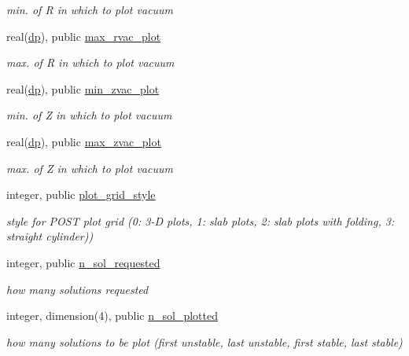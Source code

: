 \begin{DoxyCompactItemize}
\begin{DoxyCompactList}\small\item\em min. of {\ttfamily R} in which to plot vacuum \end{DoxyCompactList}\item 
real(\hyperlink{namespacenum__vars_a03802aa2bd86439d7a9370836fabf3f2}{dp}), public \hyperlink{namespacenum__vars_a6b703d539ded323851dce024a4b33df7}{max\+\_\+rvac\+\_\+plot}
\begin{DoxyCompactList}\small\item\em max. of {\ttfamily R} in which to plot vacuum \end{DoxyCompactList}\item 
real(\hyperlink{namespacenum__vars_a03802aa2bd86439d7a9370836fabf3f2}{dp}), public \hyperlink{namespacenum__vars_ab9fd7d4e9921ff8ceab88317f0c1ae5f}{min\+\_\+zvac\+\_\+plot}
\begin{DoxyCompactList}\small\item\em min. of {\ttfamily Z} in which to plot vacuum \end{DoxyCompactList}\item 
real(\hyperlink{namespacenum__vars_a03802aa2bd86439d7a9370836fabf3f2}{dp}), public \hyperlink{namespacenum__vars_a6057251380bbdf0bf71cee48c49ab84c}{max\+\_\+zvac\+\_\+plot}
\begin{DoxyCompactList}\small\item\em max. of {\ttfamily Z} in which to plot vacuum \end{DoxyCompactList}\item 
integer, public \hyperlink{namespacenum__vars_a0e40187c6517fb55cc756c5656327fb9}{plot\+\_\+grid\+\_\+style}
\begin{DoxyCompactList}\small\item\em style for P\+O\+ST plot grid (0\+: 3-\/D plots, 1\+: slab plots, 2\+: slab plots with folding, 3\+: straight cylinder)) \end{DoxyCompactList}\item 
integer, public \hyperlink{namespacenum__vars_a3deb68d5c9cd3a99c9dd779e18c4d129}{n\+\_\+sol\+\_\+requested}
\begin{DoxyCompactList}\small\item\em how many solutions requested \end{DoxyCompactList}\item 
integer, dimension(4), public \hyperlink{namespacenum__vars_a98df35edce5a42616685bb1ebd508c79}{n\+\_\+sol\+\_\+plotted}
\begin{DoxyCompactList}\small\item\em how many solutions to be plot (first unstable, last unstable, first stable, last stable) \end{DoxyCompactList}\item 

\end{DoxyCompactItemize}
